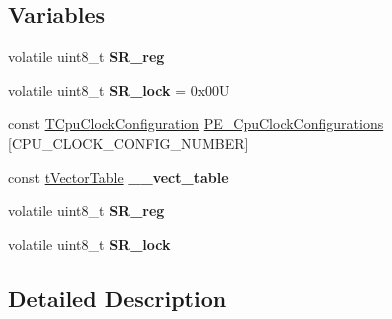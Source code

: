 \subsection*{Variables}
\begin{DoxyCompactItemize}
\item 
\hypertarget{group___cpu__module_ga326c16dd0db38f80ec48c7727d764481}{volatile uint8\-\_\-t {\bfseries S\-R\-\_\-reg}}\label{group___cpu__module_ga326c16dd0db38f80ec48c7727d764481}

\item 
\hypertarget{group___cpu__module_ga08ee8b0f642aeef5bbbce3bb4ec1bb28}{volatile uint8\-\_\-t {\bfseries S\-R\-\_\-lock} = 0x00\-U}\label{group___cpu__module_ga08ee8b0f642aeef5bbbce3bb4ec1bb28}

\item 
const \hyperlink{struct_t_cpu_clock_configuration}{T\-Cpu\-Clock\-Configuration} \hyperlink{group___cpu__module_gab69281f0e90d16198a5595ed7f471441}{P\-E\-\_\-\-Cpu\-Clock\-Configurations} \mbox{[}C\-P\-U\-\_\-\-C\-L\-O\-C\-K\-\_\-\-C\-O\-N\-F\-I\-G\-\_\-\-N\-U\-M\-B\-E\-R\mbox{]}
\item 
\hypertarget{group___cpu__module_ga17baaa5ab2c8895394c51a01248c5195}{const \hyperlink{structt_vector_table}{t\-Vector\-Table} {\bfseries \-\_\-\-\_\-vect\-\_\-table}}\label{group___cpu__module_ga17baaa5ab2c8895394c51a01248c5195}

\item 
\hypertarget{group___cpu__module_ga326c16dd0db38f80ec48c7727d764481}{volatile uint8\-\_\-t {\bfseries S\-R\-\_\-reg}}\label{group___cpu__module_ga326c16dd0db38f80ec48c7727d764481}

\item 
\hypertarget{group___cpu__module_ga08ee8b0f642aeef5bbbce3bb4ec1bb28}{volatile uint8\-\_\-t {\bfseries S\-R\-\_\-lock}}\label{group___cpu__module_ga08ee8b0f642aeef5bbbce3bb4ec1bb28}

\end{DoxyCompactItemize}


\subsection{Detailed Description}


